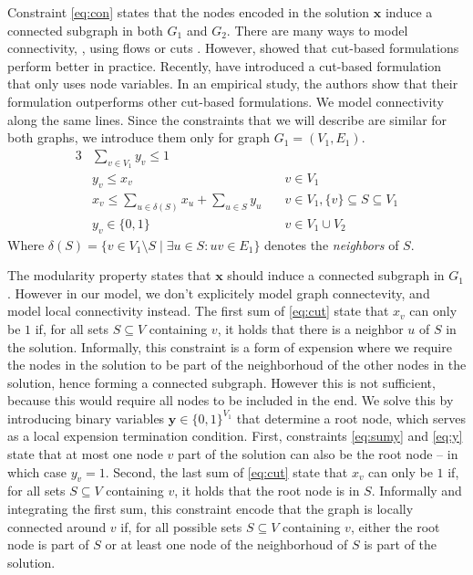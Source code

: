 		Constraint \eqref{eq:con} states that the nodes encoded in the solution $\mathbf{x}$ induce a connected subgraph in both $G_1$ and $G_2$.
		There are many ways to model connectivity, \eg, using flows or cuts
		\parencite{magnanti1995optimal}.
		However, \textcite{dilkina2010solving} showed that cut-based formulations perform better in practice.
		Recently, \textcite{alvarez2013maximum} have introduced a cut-based formulation that only uses node variables.
		In an empirical study, the authors show that their formulation outperforms other cut-based formulations.
		We model connectivity along the same lines.
		Since the constraints that we will describe are similar for both graphs, we introduce them only for graph $G_1 = (V_1, E_1)$.
		\allowdisplaybreaks
		\begin{alignat}{3}
		\label{eq:sumy} & \sum_{v \in V_1} y_v \leq 1 & \\
		\label{eq:y}    & y_v \leq x_v & v \in V_1\\
		\label{eq:cut}  & x_v \leq \sum_{u \in \delta(S)} x_u + \sum_{u \in S} y_u
                  		\quad & v \in V_1, \{v\} \subseteq S \subseteq{V_1}\\
		\label{eq:vars3} & y_v \in \{0,1\} & v \in V_1 \cup V_2
		\end{alignat}
		Where $\delta(S) = \{ v \in V_1 \setminus S \mid \exists u \in S: uv \in E_1 \}$ denotes the \emph{neighbors} of $S$.

		The modularity property states that $\mathbf{x}$ should induce a connected subgraph in $G_1$.
		However in our model, we don't explicitely model graph connectevity, and model local connectivity instead.
		The first sum of \eqref{eq:cut} state that $x_v$ can only be $1$ if, for all sets $S \subseteq V$ containing $v$, it holds that there is a neighbor $u$ of $S$ in the solution.
		Informally, this constraint is a form of expension where we require the nodes in the solution to be part of the neighborhoud of the other nodes in the solution, hence forming a connected subgraph.
		However this is not sufficient, because this would require all nodes to be included in the end.
		We solve this by introducing binary variables $\mathbf{y} \in \{0, 1\}^{V_1}$ that determine a root node, which serves as a local expension termination condition.
		First, constraints \eqref{eq:sumy} and \eqref{eq:y} state that at most one node $v$ part of the solution can also be the root node -- in which case $y_v = 1$.
		Second, the last sum of \eqref{eq:cut} state that $x_v$ can only be $1$ if, for all sets $S
		\subseteq V$ containing $v$, it holds that the root node is in $S$.
		Informally and integrating the first sum, this constraint encode that the graph is locally connected around $v$ if, for all possible sets $S \subseteq V$ containing $v$, either the root node is part of $S$ or at least one node of the neighborhoud of $S$ is part of the solution.

